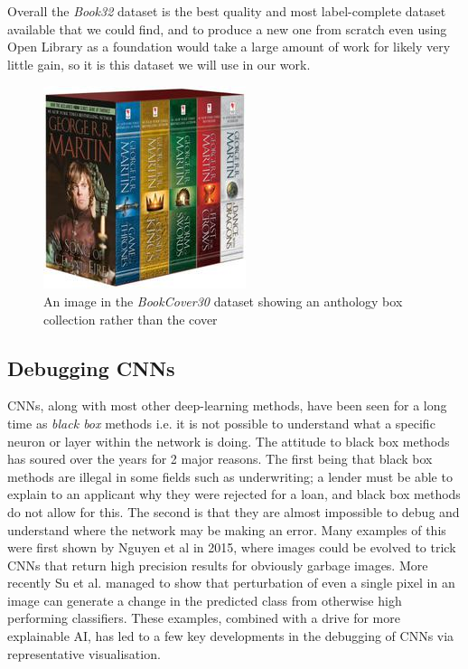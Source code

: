 \documentclass[12pt]{article}
\numberwithin{equation}{section}
\numberwithin{figure}{section}
\begin{document}
Overall the \emph{Book32} dataset is the best quality and most label-complete dataset available that we could find, and to produce a new one from scratch even using Open Library as a foundation would take a large amount of work for likely very little gain, so it is this dataset we will use in our work.
\begin{figure}
	\centering
	\captionsetup{justification=centering}
	\includegraphics[scale=0.4]{0345535529.jpg}
	\caption{An image in the \emph{BookCover30} dataset showing an anthology box collection rather than the cover}
	\label{fig:bad_cover}
\end{figure}
\subsection{Debugging CNNs}
\label{sub:debug_cnn}
CNNs, along with most other deep-learning methods, have been seen for a long time as \emph{black box} methods i.e. it is not possible to understand what a specific neuron or layer within the network is doing. The attitude to black box methods has soured over the years for 2 major reasons. The first being that black box methods are illegal in some fields such as underwriting; a lender must be able to explain to an applicant why they were rejected for a loan, and black box methods do not allow for this. The second is that they are almost impossible to debug and understand where the network may be making an error. Many examples of this were first shown by Nguyen et al \cite{Nguyen} in 2015, where images could be evolved to trick CNNs that return high precision results for obviously garbage images. More recently Su et al. \cite{Su} managed to show that perturbation of even a single pixel in an image can generate a change in the predicted class from otherwise high performing classifiers. These examples, combined with a drive for more explainable AI, has led to a few key developments in the debugging of CNNs via representative visualisation. 
\end{document}
